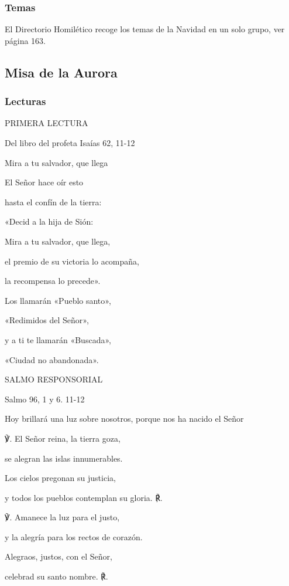 \documentclass[]{article}
\begin{document}
\subsubsection{Temas}\label{temas-5}

El Directorio Homilético recoge los temas de la Navidad en un solo
grupo, ver página 163.

\subsection{Misa de la Aurora}\label{misa-de-la-aurora}

\subsubsection{Lecturas}\label{lecturas-6}

PRIMERA LECTURA

Del libro del profeta Isaías 62, 11-12

Mira a tu salvador, que llega

El Señor hace oír esto

hasta el confín de la tierra:

«Decid a la hija de Sión:

Mira a tu salvador, que llega,

el premio de su victoria lo acompaña,

la recompensa lo precede».

Los llamarán «Pueblo santo»,

«Redimidos del Señor»,

y a ti te llamarán «Buscada»,

«Ciudad no abandonada».

SALMO RESPONSORIAL

Salmo 96, 1 y 6. 11-12

Hoy brillará una luz sobre nosotros, porque nos ha nacido el Señor

℣. El Señor reina, la tierra goza,

se alegran las islas innumerables.

Los cielos pregonan su justicia,

y todos los pueblos contemplan su gloria. ℟.

℣. Amanece la luz para el justo,

y la alegría para los rectos de corazón.

Alegraos, justos, con el Señor,

celebrad su santo nombre. ℟.
\end{document}
